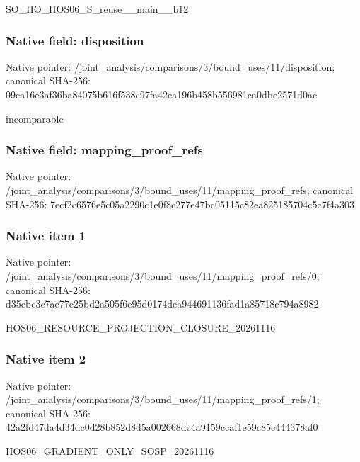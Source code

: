 \documentclass[10pt,a4paper]{article}
\begin{document}
\begingroup\raggedright\sloppy SO\_\allowbreak{}HO\_\allowbreak{}HOS06\_\allowbreak{}S\_\allowbreak{}reuse\_\allowbreak{}\_\allowbreak{}main\_\allowbreak{}\_\allowbreak{}b12\par\endgroup

\subsubsection{Native field: disposition}
Native pointer: /joint\_\allowbreak{}analysis/comparisons/3/bound\_\allowbreak{}uses/11/disposition; canonical SHA-256: 09ca16e3af36ba84075b616f538c97fa42ea196b458b556981ca0dbe2571d0ac

\begingroup\raggedright\sloppy incomparable\par\endgroup

\subsubsection{Native field: mapping\_\allowbreak{}proof\_\allowbreak{}refs}
Native pointer: /joint\_\allowbreak{}analysis/comparisons/3/bound\_\allowbreak{}uses/11/mapping\_\allowbreak{}proof\_\allowbreak{}refs; canonical SHA-256: 7ecf2c6576e5c05a2290c1e0f8c277e47bc05115c82ea825185704c5c7f4a303

\subsubsection{Native item 1}
Native pointer: /joint\_\allowbreak{}analysis/comparisons/3/bound\_\allowbreak{}uses/11/mapping\_\allowbreak{}proof\_\allowbreak{}refs/0; canonical SHA-256: d35cbc3c7ae77c25bd2a505f6e95d0174dca944691136fad1a85718c794a8982

\begingroup\raggedright\sloppy HOS06\_\allowbreak{}RESOURCE\_\allowbreak{}PROJECTION\_\allowbreak{}CLOSURE\_\allowbreak{}20261116\par\endgroup

\subsubsection{Native item 2}
Native pointer: /joint\_\allowbreak{}analysis/comparisons/3/bound\_\allowbreak{}uses/11/mapping\_\allowbreak{}proof\_\allowbreak{}refs/1; canonical SHA-256: 42a2fd47da4d34dc0d28b852d8d5a002668dc4a9159ccaf1e59c85c444378af0

\begingroup\raggedright\sloppy HOS06\_\allowbreak{}GRADIENT\_\allowbreak{}ONLY\_\allowbreak{}SOSP\_\allowbreak{}20261116\par\endgroup
\end{document}
